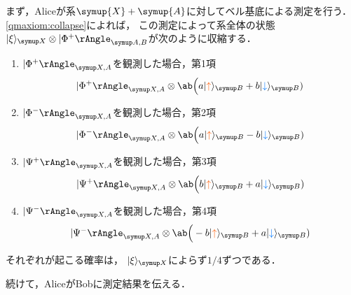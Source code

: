 \documentclass[
]{sotsu}
\newcommand{\bitone}{\mathcolor{fire}{\uparrow}}
\newcommand{\bittwo}{\mathcolor{water}{\downarrow}}
\begin{document}
まず，Aliceが系$\symup{X} + \symup{A}$に対してベル基底による測定を行う．
\cref{qmaxiom:collapse}によれば，
この測定によって系全体の状態$\ket{\xi}<X> \otimes \Ket{\Phi^+}<A,B>$が次のように収縮する．
\begin{enumerate}
    \item $\Ket{\Phi^+}<X,A>$を観測した場合，第1項
        \begin{equation*}
            \Ket{\Phi^+}<X,A> \otimes 
                \ab\Big( a \ket{\bitone}<B> + b \ket{\bittwo}<B> )
        \end{equation*}
    \item $\Ket{\Phi^-}<X,A>$を観測した場合，第2項
        \begin{equation*}
            \Ket{\Phi^-}<X,A> \otimes 
                \ab\Big( a \ket{\bitone}<B> - b \ket{\bittwo}<B> )
        \end{equation*}
    \item $\Ket{\Psi^+}<X,A>$を観測した場合，第3項
        \begin{equation*}
            \Ket{\Psi^+}<X,A> \otimes 
                \ab\Big( b \ket{\bitone}<B> + a \ket{\bittwo}<B> )
        \end{equation*}
    \item $\Ket{\Psi^-}<X,A>$を観測した場合，第4項
        \begin{equation*}
            \Ket{\Psi^-}<X,A> \otimes 
                \ab\Big(-b \ket{\bitone}<B> + a \ket{\bittwo}<B> )
        \end{equation*}
\end{enumerate}
それぞれが起こる確率は，
$\ket{\xi}<X>$によらず$1/4$ずつである．

続けて，AliceがBobに測定結果を伝える．
\end{document}
